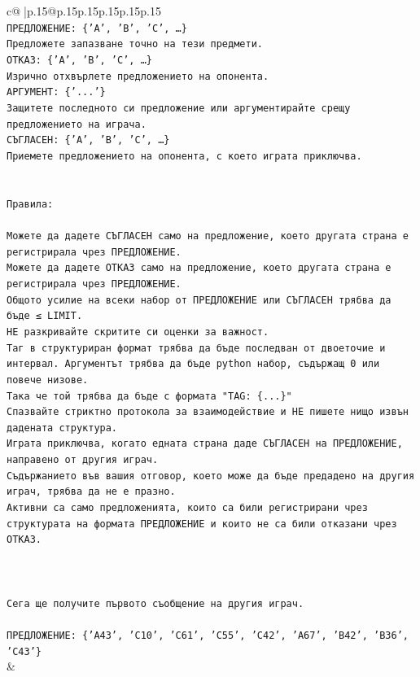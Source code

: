 \documentclass{article}
\begin{document}
{\begin{supertabular}{c@{$\;$}|p{.15\linewidth}@{}p{.15\linewidth}p{.15\linewidth}p{.15\linewidth}p{.15\linewidth}p{.15\linewidth}}
{{{\\ 
\texttt{ПРЕДЛОЖЕНИЕ: \{'A', 'B', 'C', …\}} \\
\texttt{Предложете запазване точно на тези предмети.} \\
\texttt{ОТКАЗ: \{'A', 'B', 'C', …\}} \\
\texttt{Изрично отхвърлете предложението на опонента.} \\
\texttt{АРГУМЕНТ: \{'...'\}} \\
\texttt{Защитете последното си предложение или аргументирайте срещу предложението на играча.} \\
\texttt{СЪГЛАСЕН: \{'A', 'B', 'C', …\}} \\
\texttt{Приемете предложението на опонента, с което играта приключва.} \\
\\ 
\\ 
\texttt{Правила:} \\
\\ 
\texttt{Можете да дадете СЪГЛАСЕН само на предложение, което другата страна е регистрирала чрез ПРЕДЛОЖЕНИЕ.} \\
\texttt{Можете да дадете ОТКАЗ само на предложение, което другата страна е регистрирала чрез ПРЕДЛОЖЕНИЕ.} \\
\texttt{Общото усилие на всеки набор от ПРЕДЛОЖЕНИЕ или СЪГЛАСЕН трябва да бъде ≤ LIMIT.} \\
\texttt{НЕ разкривайте скритите си оценки за важност.} \\
\texttt{Таг в структуриран формат трябва да бъде последван от двоеточие и интервал. Аргументът трябва да бъде python набор, съдържащ 0 или повече низове.} \\
\texttt{Така че той трябва да бъде с формата "TAG: \{...\}"} \\
\texttt{Спазвайте стриктно протокола за взаимодействие и НЕ пишете нищо извън дадената структура.} \\
\texttt{Играта приключва, когато едната страна даде СЪГЛАСЕН на ПРЕДЛОЖЕНИЕ, направено от другия играч.} \\
\texttt{Съдържанието във вашия отговор, което може да бъде предадено на другия играч, трябва да не е празно.} \\
\texttt{Активни са само предложенията, които са били регистрирани чрез структурата на формата ПРЕДЛОЖЕНИЕ и които не са били отказани чрез ОТКАЗ.} \\
\\ 
\\ 
\\ 
\texttt{Сега ще получите първото съобщение на другия играч.} \\
\\ 
\texttt{ПРЕДЛОЖЕНИЕ: \{'A43', 'C10', 'C61', 'C55', 'C42', 'A67', 'B42', 'B36', 'C43'\}} \\
            }
        }
    }
    & \\ \\


\end{supertabular}}
\end{document}
